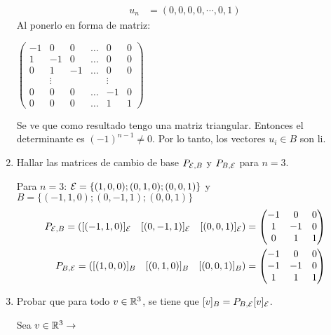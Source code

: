 \begin{enumerate}
\begin{mdframed}[style=s]
\begin{align*}
                    u_n&=(0,0,0,0,\cdots,0,1)
                \end{align*}
                Al ponerlo en forma de matriz:
                \begin{center}
                    $\begin{pmatrix}
                        -1&0&0&\dots&0&0\\
                        1&-1&0&\dots&0&0\\
                        0&1&-1&\dots&0&0\\
                        &\vdots&&&\vdots&\\
                        0&0&0&\dots&-1&0\\
                        0&0&0&\dots&1&1
                    \end{pmatrix}$
                \end{center}
                Se ve que como resultado tengo una matriz triangular. Entonces el determinante es $(-1)^{n-1}\neq 0$. Por lo tanto, los vectores $u_i\in B$ son li.
            \end{mdframed}
        \item Hallar las matrices de cambio de base $P_{\mathcal{E},B}$ y $P_{B,\mathcal{E}}$ para $n=3$.
            \begin{mdframed}[style=s]
                Para $n=3$: $\mathcal{E}=\{(1,0,0);(0,1,0);(0,0,1)\}$ y $B=\{(-1,1,0);(0,-1,1);(0,0,1)\}$
                \begin{align*}
                    P_{\mathcal{E},B}=\left([(-1,1,0)]_{\mathcal{E}}\quad[(0,-1,1)]_{\mathcal{E}}\quad[(0,0,1)]_{\mathcal{E}}\right)&=\begin{pmatrix}
                        -1&0&0\\1&-1&0\\0&1&1
                    \end{pmatrix}\\
                    P_{B,\mathcal{E}}=\left([(1,0,0)]_B\quad[(0,1,0)]_B\quad[(0,0,1)]_B\right)&=\begin{pmatrix}
                        -1&0&0\\-1&-1&0\\1&1&1
                    \end{pmatrix}
                \end{align*}
            \end{mdframed}
        \item Probar que para todo $v\in\mathbb{R}^3$, se tiene que $[v]_B=P_{B,\mathcal{E}}[v]_{\mathcal{E}}$.
            \begin{mdframed}[style=s]
                Sea $v\in\mathbb{R}^3\to$

\end{mdframed}
\end{enumerate}
